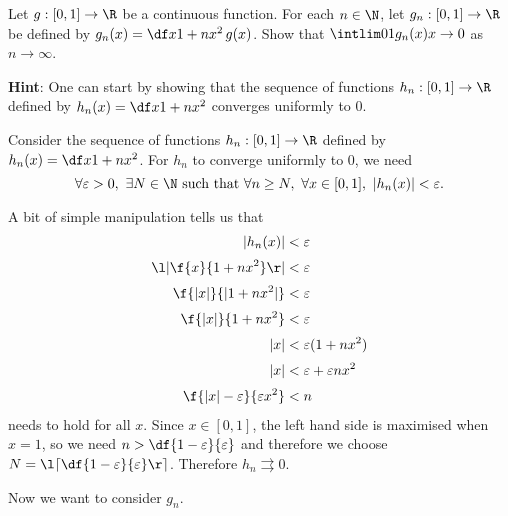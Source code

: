 \documentclass[a4paper]{article}
\begin{document}


\begin{questionbody}
Let $g : [0, 1] \to \R$ be a continuous function. For each $n \in \N$, let $g_n : [0, 1] \to \R$ be defined by $g_n(x) = \df x{1 + nx^2} \, g(x)$. Show that $\intlim 01 {g_n(x)} x \to 0$ as $n \to \infty$.

\textbf{Hint}: One can start by showing that the sequence of functions $h_n : [0, 1] \to \R$ defined by $h_n(x) = \df x{1 + nx^2}$ converges uniformly to 0.
\end{questionbody}

Consider the sequence of functions $h_n : [0, 1] \to \R$ defined by $h_n(x) = \df x{1 + nx^2}$. For $h_n$ to converge uniformly to 0, we need \[
\forall \varepsilon > 0,\ \exists N \in \N \text{ such that } \forall n \ge N,\ \forall x \in [0, 1],\ |h_n(x)| < \varepsilon .
\]

A bit of simple manipulation tells us that \begin{align*}
|h_n(x)| &< \varepsilon \\[0.5ex]
\l| \f{x}{1 + nx^2} \r| &< \varepsilon \\[0.5ex]
\f{|x|}{|1 + nx^2|} &< \varepsilon \\[0.5ex]
\f{|x|}{1 + nx^2} &< \varepsilon \\[0.5ex]
|x| &< \varepsilon (1 + nx^2) \\[0.5ex]
|x| &< \varepsilon + \varepsilon nx^2 \\[0.5ex]
\f{|x| - \varepsilon}{\varepsilon x^2} &< n
\end{align*}
needs to hold for all $x$. Since $x \in [0, 1]$, the left hand side is maximised when $x=1$, so we need $n > \df{1-\varepsilon}{\varepsilon}$ and therefore we choose $N = \l\lceil \df{1 - \varepsilon}{\varepsilon} \r\rceil$. Therefore $h_n \rightrightarrows 0$.

Now we want to consider $g_n$. %

\end{document}
